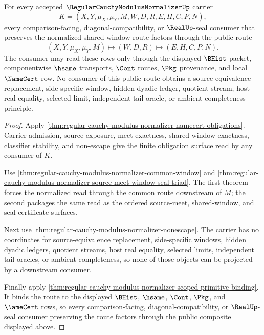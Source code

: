 \begin{theorem}
\label{thm:regular-cauchy-modulus-normalizer-public-route}
For every accepted $\RegularCauchyModulusNormalizerUp$ carrier
$$
K=(X,Y,\mu_X,\mu_Y,M,W,D,R,E,H,C,P,N),
$$
every comparison-facing, diagonal-compatibility, or $\RealUp$-seal consumer that preserves the normalized shared-window route factors through the public route
$$
(X,Y,\mu_X,\mu_Y,M) \longmapsto (W,D,R) \longmapsto (E,H,C,P,N).
$$
The consumer may read these rows only through the displayed $\BHist$ packet, componentwise $\hsame$ transports, $\Cont$ routes, $\Pkg$ provenance, and local $\NameCert$ row. No consumer of this public route obtains a source-equivalence replacement, side-specific window, hidden dyadic ledger, quotient stream, host real equality, selected limit, independent tail oracle, or ambient completeness principle.
\end{theorem}
\begin{proof}
Apply \autoref{thm:regular-cauchy-modulus-normalizer-namecert-obligations}. Carrier admission, source exposure, meet exactness, shared-window exactness, classifier stability, and non-escape give the finite obligation surface read by any consumer of $K$.

Use \autoref{thm:regular-cauchy-modulus-normalizer-common-window} and \autoref{thm:regular-cauchy-modulus-normalizer-source-meet-window-seal-triad}. The first theorem forces the normalized read through the common route downstream of $M$; the second packages the same read as the ordered source-meet, shared-window, and seal-certificate surfaces.

Next use \autoref{thm:regular-cauchy-modulus-normalizer-nonescape}. The carrier has no coordinates for source-equivalence replacement, side-specific windows, hidden dyadic ledgers, quotient streams, host real equality, selected limits, independent tail oracles, or ambient completeness, so none of those objects can be projected by a downstream consumer.

Finally apply \autoref{thm:regular-cauchy-modulus-normalizer-scoped-primitive-binding}. It binds the route to the displayed $\BHist$, $\hsame$, $\Cont$, $\Pkg$, and $\NameCert$ rows, so every comparison-facing, diagonal-compatibility, or $\RealUp$-seal consumer preserving the route factors through the public composite displayed above.
\end{proof}

